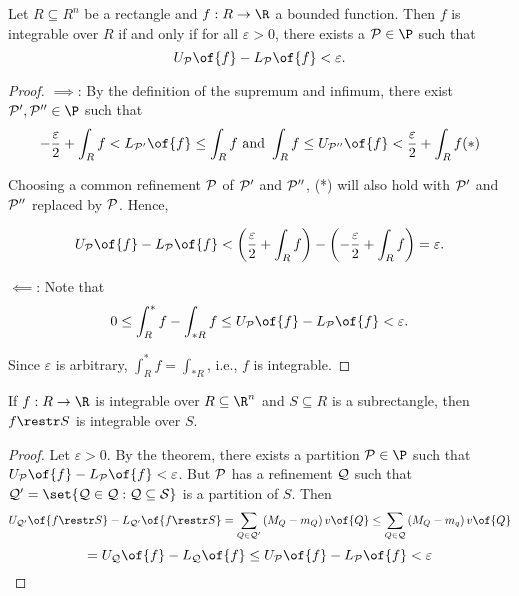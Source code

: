 \begin{theorem}
    Let $R \subseteq R^n$ be a rectangle and $f: R \to \R$ a bounded function. Then $f$ is integrable over $R$ if and only if for all $\varepsilon > 0$, there exists a $\cal{P} \in \P$ such that
    \[U_{\cal{P}}\of{f} - L_{\cal{P}}\of{f} < \varepsilon.\]
\end{theorem}
\begin{proof}
    $\implies$: By the definition of the supremum and infimum, there exist $\cal{P}', \cal{P}'' \in \P$ such that
    \[-\frac{\varepsilon}{2} + \int_R f < L_{\cal{P}'}\of{f} \leq \int_R f \text{ and } \int_R f \leq U_{\cal{P}''}\of{f} < \frac{\varepsilon}{2} + \int_R f (*)\]

    Choosing a common refinement $\cal{P}$ of $\cal{P}'$ and $\cal{P}''$, (*) will also hold with $\cal{P}'$ and $\cal{P}''$ replaced by $\cal{P}$. Hence,

    \[U_{\cal{P}}\of{f} - L_{\cal{P}}\of{f} < \left(\frac{\varepsilon}{2} + \int_R f\right) - \left(-\frac{\varepsilon}{2} + \int_R f\right) = \varepsilon.\]

    $\impliedby$: Note that
    \[0 \leq \int_R^* f - \int_{*R} f \leq U_{\cal{P}}\of{f} - L_{\cal{P}}\of{f} < \varepsilon.\]

    Since $\varepsilon$ is arbitrary, $\int_R^* f = \int_{*R}$, i.e., $f$ is integrable.
\end{proof}

\begin{corollary}
    If $f: R \to \R$ is integrable over $R \subseteq \R^n$ and $S \subseteq R$ is a subrectangle, then $f \restr S$ is integrable over $S$.
\end{corollary}
\begin{proof}
    Let $\varepsilon > 0$. By the theorem, there exists a partition $\cal{P} \in \P$ such that $U_{\cal{P}}\of{f} - L_{\cal{P}}\of{f} < \varepsilon$. But $\cal{P}$ has a refinement $\cal{Q}$ such that $\cal{Q}' = \set{Q \in \cal{Q}: Q \subseteq S}$ is a partition of $S$. Then 
    \[U_{\cal{Q}'}\of{f \restr S} - L_{\cal{Q}'}\of{f \restr S} = \sum_{Q \in \cal{Q}'} \left(M_Q - m_Q\right) v\of{Q} \leq \sum_{Q \in \cal{Q}} \left(M_Q - m_q\right) v\of{Q}\]
    \[= U_{\cal{Q}}\of{f} - L_{\cal{Q}}\of{f} \leq U_{\cal{P}}\of{f} - L_{\cal{P}}\of{f} < \varepsilon\]
\end{proof}

